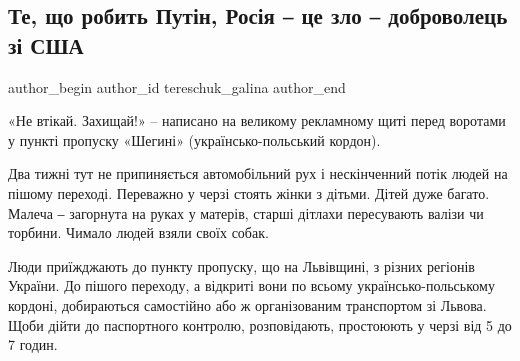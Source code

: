  
 
 
 
 
 
\subsection{Те, що робить Путін, Росія ‒ це зло ‒ доброволець зі США}
\label{sec:09_03_2022.stz.news.ua.radiosvoboda.1.rosia_ce_zlo}
 
\ifcmt
 author_begin
   author_id tereschuk_galina
 author_end
\fi

«Не втікай. Захищай!» – написано на великому рекламному щиті перед воротами у
пункті пропуску «Шегині» (українсько-польський кордон).


Два тижні тут не припиняється автомобільний рух і нескінченний потік людей на
пішому переході. Переважно у черзі стоять жінки з дітьми. Дітей дуже багато.
Малеча ‒ загорнута на руках у матерів, старші дітлахи пересувають валізи чи
торбини. Чимало людей взяли своїх собак.

Люди приїжджають до пункту пропуску, що на Львівщині, з різних регіонів
України. До пішого переходу, а відкриті вони по всьому українсько-польському
кордоні, добираються самостійно або ж організованим транспортом зі Львова. Щоби
дійти до паспортного контролю, розповідають, простоюють у черзі від 5 до 7
годин.

